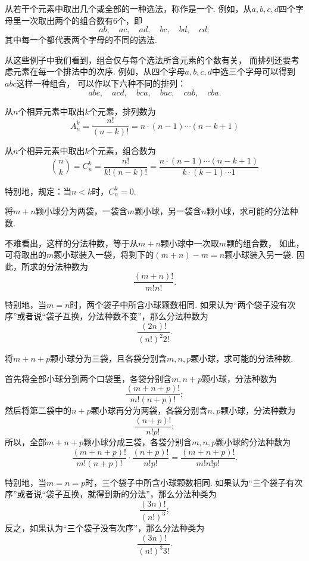 从若干个元素中取出几个或全部的一种选法，称作是一个.
例如，从\(a,b,c,d\)四个字母里一次取出两个的组合数有6个，即\[
	ab, \quad
	ac, \quad
	ad, \quad
	bc, \quad
	bd, \quad
	cd;
\]
其中每一个都代表两个字母的不同的选法.

从这些例子中我们看到，组合仅与每个选法所含元素的个数有关，
而排列还要考虑元素在每一个排法中的次序.
例如，从四个字母\(a,b,c,d\)中选三个字母可以得到\(abc\)这样一种组合，
可以作以下六种不同的排列：\[
	abc, \quad
	acd, \quad
	bca, \quad
	bac, \quad
	cab, \quad
	cba.
\]

\begin{definition}
从\(n\)个相异元素中取出\(k\)个元素，排列数为\[
A_n^k = \frac{n!}{(n-k)!} = n \cdot (n-1) \dotsm (n-k+1)
\]
\end{definition}

\begin{definition}
从\(n\)个相异元素中取出\(k\)个元素，组合数为\[
\binom{n}{k} =
C_n^k = \frac{n!}{k!(n-k)!} = \frac{n \cdot (n-1) \dotsm (n-k+1)}{k \cdot (k-1) \dotsm 1}
\]

特别地，规定：当\(n < k\)时，\(C_n^k = 0\).
\end{definition}

\begin{example}
将\(m+n\)颗小球分为两袋，一袋含\(m\)颗小球，另一袋含\(n\)颗小球，求可能的分法种数.
\begin{solution}
不难看出，这样的分法种数，等于从\(m+n\)颗小球中一次取\(m\)颗的组合数，
如此，可将取出的\(m\)颗小球装入一袋，将剩下的\((m+n)-m=n\)颗小球装入另一袋.
因此，所求的分法种数为\[
	\frac{(m+n)!}{m! n!}.
\]

特别地，当\(m=n\)时，两个袋子中所含小球颗数相同.
如果认为“两个袋子没有次序”或者说“袋子互换，分法种数不变”，那么分法种数为\[
	\frac{(2n)!}{(n!)^2 2!}.
\]
\end{solution}
\end{example}

\begin{example}
将\(m+n+p\)颗小球分为三袋，且各袋分别含\(m,n,p\)颗小球，求可能的分法种数.
\begin{solution}
首先将全部小球分到两个口袋里，各袋分别含\(m,n+p\)颗小球，分法种数为\[
	\frac{(m+n+p)!}{m!(n+p)!};
\]
然后将第二袋中的\(n+p\)颗小球再分为两袋，各袋分别含\(n,p\)颗小球，分法种数为\[
	\frac{(n+p)!}{n! p!};
\]
所以，全部\(m+n+p\)颗小球分成三袋，各袋分别含\(m,n,p\)颗小球的分法种数为\[
	\frac{(m+n+p)!}{m!(n+p)!} \cdot \frac{(n+p)!}{n! p!}
	= \frac{(m+n+p)!}{m! n! p!}.
\]

特别地，当\(m=n=p\)时，三个袋子中所含小球颗数相同.
如果认为“三个袋子有次序”或者说“袋子互换，就得到新的分法”，那么分法种类为\[
	\frac{(3n)!}{(n!)^3};
\]
反之，如果认为“三个袋子没有次序”，那么分法种类为\[
	\frac{(3n)!}{(n!)^3 3!}.
\]
\end{solution}
\end{example}


